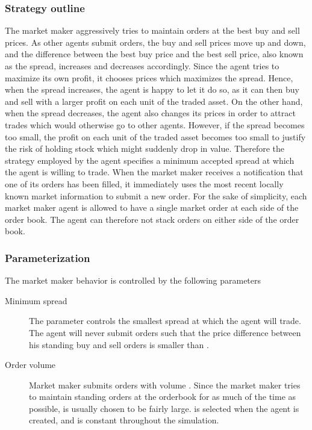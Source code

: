 \subsubsection{Strategy outline}
The market maker aggressively tries to maintain orders at the best buy and sell prices. As other agents submit orders, the buy and sell prices move up and down, and the difference between the best buy price and the best sell price, also known as the spread, increases and decreases accordingly. Since the agent tries to maximize its own profit, it chooses prices which maximizes the spread. Hence, when the spread increases, the agent is happy to let it do so, as it can then buy and sell with a larger profit on each unit of the traded asset. On the other hand, when the spread decreases, the agent also changes its prices in order to attract trades which would otherwise go to other agents. However, if the spread becomes too small, the profit on each unit of the traded asset becomes too small to justify the risk of holding stock which might suddenly drop in value. Therefore the strategy employed by the agent specifies a minimum accepted spread at which the agent is willing to trade. When the market maker receives a notification that one of its orders has been filled, it immediately uses the most recent locally known market information to submit a new order. For the sake of simplicity, each market maker agent is allowed to have a single market order at each side of the order book. The agent can therefore not stack orders on either side of the order book. 

\subsubsection{Parameterization}
The market maker behavior is controlled by the following parameters
\begin{description}
\item[Minimum spread] The parameter  controls the smallest spread at which the agent will trade. The agent will never submit orders such that the price difference between his standing buy and sell orders is smaller than \ssmmlatencyagent{}.
\item[Order volume] Market maker  submits orders with volume . Since the market maker tries to maintain standing orders at the orderbook for as much of the time as possible,  is usually chosen to be fairly large.  is selected when the agent is created, and is constant throughout the simulation.
\end{description}


